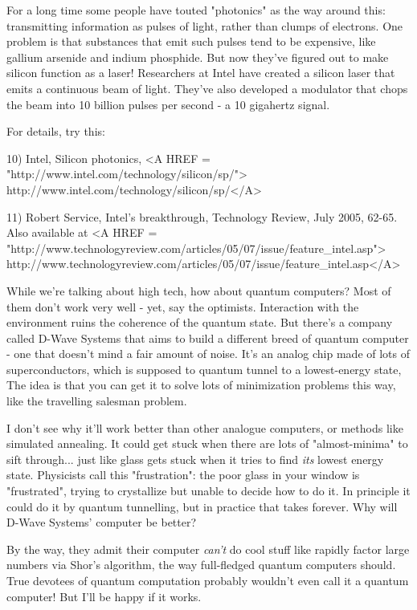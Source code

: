 For a long time some people have touted "photonics" 
as the way around this: 
transmitting information as pulses of light, rather than clumps of electrons.
One problem is that substances that emit such pulses tend to be expensive, 
like gallium arsenide and indium phosphide.  But now they've figured out to 
make silicon function as a laser!  Researchers at Intel have created a silicon 
laser that emits a continuous beam of light.  They've also developed a modulator 
that chops the beam into 10 billion pulses per second - a 10 gigahertz signal.  

For details, try this:

10) Intel, Silicon photonics, <A HREF = 
"http://www.intel.com/technology/silicon/sp/">
http://www.intel.com/technology/silicon/sp/</A>


11) Robert Service, Intel's breakthrough, Technology Review, July 2005, 62-65.  
    Also available at <A HREF = 
"http://www.technologyreview.com/articles/05/07/issue/feature_intel.asp">
http://www.technologyreview.com/articles/05/07/issue/feature_intel.asp</A>

While we're talking about high tech, how about quantum computers?  Most of
them don't work very well - yet, say the optimists.  Interaction with the 
environment ruins the coherence of the quantum state.  But there's a company
called D-Wave Systems that aims to build a different breed of quantum computer - 
one that doesn't mind a fair amount of noise.   It's an analog chip made of lots
of superconductors, which is supposed to quantum tunnel to a lowest-energy state,
The idea is that you can get it to solve lots of minimization problems this way,
like the travelling salesman problem.  

I don't see why it'll work better than other analogue computers, or methods 
like simulated annealing.  It could get stuck when there are lots of 
"almost-minima"
to sift through... just 
like glass gets stuck when it tries to find \emph{its} lowest
energy state.  Physicists call this 
"frustration": the poor glass in your window
is "frustrated", 
trying to crystallize but unable to decide how to do it.  In
principle it could do it by quantum tunnelling, but in practice that takes forever.
Why will D-Wave Systems' computer be better?

By the way, they admit their computer \emph{can't} do cool stuff like rapidly factor 
large numbers via Shor's algorithm, the way full-fledged quantum computers should.  
True devotees of quantum computation probably wouldn't even call it a quantum 
computer!  But I'll be happy if it works.

